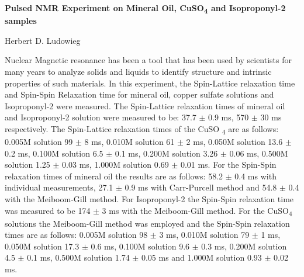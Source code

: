 \documentclass{article}
\begin{document}
\Centering
\Large{\textbf{Pulsed NMR Experiment on Mineral Oil, CuSO\textsubscript{4} and 
Isoproponyl-2 samples}} \\
\small{Herbert D. Ludowieg \\
\begin{adjustwidth}{0.5in}{0.5in}
\justify
Nuclear Magnetic resonance has been a tool that has been used by scientists for
many years to analyze solids and liquids to identify structure and intrinsic 
properties of such materials. In this experiment, the Spin-Lattice relaxation 
time and Spin-Spin Relaxation time for mineral oil, copper sulfate solutions 
and Isoproponyl-2 were measured. The Spin-Lattice relaxation times of mineral 
oil and Isoproponyl-2 solution were measured to be: 37.7 $\pm$ 0.9 ms, 570 
$\pm$ 30 ms respectively. The Spin-Lattice relaxation times of the CuSO
\textsubscript{4} are as follows: 0.005M solution 99 $\pm$ 8 ms, 0.010M 
solution 61 $\pm$ 2 ms, 0.050M solution 13.6 $\pm$ 0.2 ms, 0.100M solution
6.5 $\pm$ 0.1 ms, 0.200M solution 3.26 $\pm$ 0.06 ms, 0.500M solution 1.25 
$\pm$ 0.03 ms, 1.000M solution 0.69 $\pm$ 0.01 ms. For the Spin-Spin relaxation 
times of mineral oil the results are as follows: 58.2 $\pm$ 0.4 ms with 
individual measurements, 27.1 $\pm$ 0.9 ms with Carr-Purcell method and 54.8 
$\pm$ 0.4 with the Meiboom-Gill method. For Isoproponyl-2 the Spin-Spin 
relaxation time was measured to be 174 $\pm$ 3 ms with the Meiboom-Gill method. 
For the CuSO\textsubscript{4} solutions the Meiboom-Gill method was employed 
and the Spin-Spin relaxation times are as follows: 0.005M solution 98 $\pm$ 3 
ms, 0.010M solution 79 $\pm$ 1 ms, 0.050M solution 17.3 $\pm$ 0.6 ms, 0.100M 
solution 9.6 $\pm$ 0.3 ms, 0.200M solution 4.5 $\pm$ 0.1 ms, 0.500M solution 
1.74 $\pm$ 0.05 ms and 1.000M solution 0.93 $\pm$ 0.02 ms.
\end{adjustwidth}
\begin{multicols}{2}
\justify

\end{multicols}}
\end{document}
